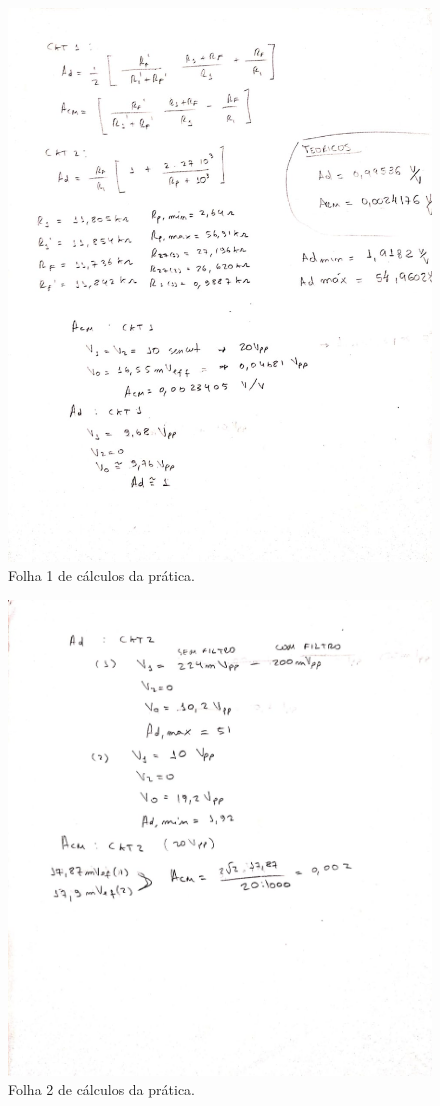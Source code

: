 \begin{figure}[H] 
\includegraphics[scale=0.4]{imagens/calc1.jpeg} 
\centering
\caption{Folha 1 de cálculos da prática.}
\label{p5-2} 
\end{figure} 

\begin{figure}[H] 
\includegraphics[scale=0.4]{imagens/calc2.jpeg} 
\centering
\caption{Folha 2 de cálculos da prática.}
\label{p5-2} 
\end{figure} 




     






